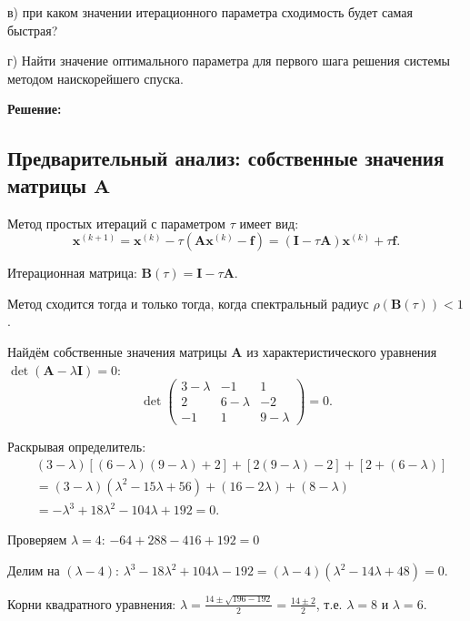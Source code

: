 \documentclass{article}
\begin{document}
в) при каком значении итерационного параметра сходимость будет самая быстрая?

г) Найти значение оптимального параметра для первого шага решения системы методом наискорейшего спуска.

\vspace{0.5cm}
\textbf{Решение:}

\subsection*{Предварительный анализ: собственные значения матрицы $\mathbf{A}$}

Метод простых итераций с параметром $\tau$ имеет вид:
\begin{equation}
\mathbf{x}^{(k+1)} = \mathbf{x}^{(k)} - \tau(\mathbf{A}\mathbf{x}^{(k)} - \mathbf{f}) = (\mathbf{I} - \tau\mathbf{A})\mathbf{x}^{(k)} + \tau\mathbf{f}.
\end{equation}

Итерационная матрица: $\mathbf{B}(\tau) = \mathbf{I} - \tau\mathbf{A}$.

Метод сходится тогда и только тогда, когда спектральный радиус $\rho(\mathbf{B}(\tau)) < 1$.

Найдём собственные значения матрицы $\mathbf{A}$ из характеристического уравнения $\det(\mathbf{A} - \lambda\mathbf{I}) = 0$:
\begin{equation}
\det\begin{pmatrix} 3-\lambda & -1 & 1 \\ 2 & 6-\lambda & -2 \\ -1 & 1 & 9-\lambda \end{pmatrix} = 0.
\end{equation}

Раскрывая определитель:
\begin{align}
&(3-\lambda)[(6-\lambda)(9-\lambda) + 2] + [2(9-\lambda) - 2] + [2 + (6-\lambda)] \nonumber \\
&= (3-\lambda)(\lambda^2 - 15\lambda + 56) + (16 - 2\lambda) + (8 - \lambda) \nonumber \\
&= -\lambda^3 + 18\lambda^2 - 104\lambda + 192 = 0.
\end{align}

Проверяем $\lambda = 4$: $-64 + 288 - 416 + 192 = 0$ 

Делим на $(\lambda - 4)$: $\lambda^3 - 18\lambda^2 + 104\lambda - 192 = (\lambda - 4)(\lambda^2 - 14\lambda + 48) = 0$.

Корни квадратного уравнения: $\lambda = \frac{14 \pm \sqrt{196 - 192}}{2} = \frac{14 \pm 2}{2}$, т.е. $\lambda = 8$ и $\lambda = 6$.
\end{document}
